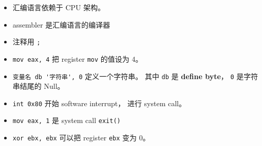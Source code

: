 
\begin{issues}
\issueDraft
\end{issues}

\begin{itemize}
\item 汇编语言依赖于 CPU 架构。
\item assembler 是汇编语言的编译器
\item 注释用 \verb|;|
\item \verb|mov eax, 4| 把 register \verb|mov| 的值设为 4。
\item \verb|变量名 db '字符串', 0| 定义一个字符串。 其中 \verb|db| 是 \textbf{define byte}， \verb|0| 是字符串结尾的 Null。
\item \verb|int 0x80| 开始 software interrupt， 进行 system call。
\item \verb|mov eax, 1| 是 system call \verb|exit()|
\item \verb|xor ebx, ebx| 可以把 register \verb|ebx| 变为 0。
\end{itemize}
